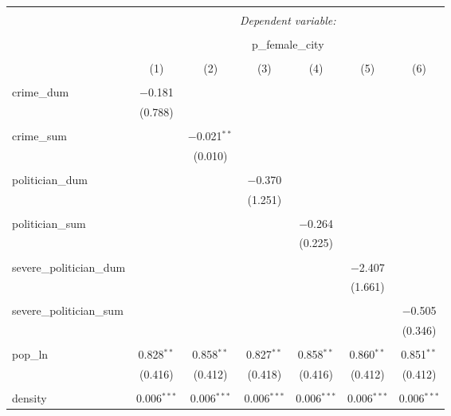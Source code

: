 
\begin{table}[!htbp] \centering 
  \caption{} 
  \label{} 
\begin{tabular}{@{\extracolsep{5pt}}lcccccc} 
\\[-1.8ex]\hline 
\hline \\[-1.8ex] 
 & \multicolumn{6}{c}{\textit{Dependent variable:}} \\ 
\cline{2-7} 
\\[-1.8ex] & \multicolumn{6}{c}{p\_female\_city} \\ 
\\[-1.8ex] & (1) & (2) & (3) & (4) & (5) & (6)\\ 
\hline \\[-1.8ex] 
 crime\_dum & $-$0.181 &  &  &  &  &  \\ 
  & (0.788) &  &  &  &  &  \\ 
  & & & & & & \\ 
 crime\_sum &  & $-$0.021$^{**}$ &  &  &  &  \\ 
  &  & (0.010) &  &  &  &  \\ 
  & & & & & & \\ 
 politician\_dum &  &  & $-$0.370 &  &  &  \\ 
  &  &  & (1.251) &  &  &  \\ 
  & & & & & & \\ 
 politician\_sum &  &  &  & $-$0.264 &  &  \\ 
  &  &  &  & (0.225) &  &  \\ 
  & & & & & & \\ 
 severe\_politician\_dum &  &  &  &  & $-$2.407 &  \\ 
  &  &  &  &  & (1.661) &  \\ 
  & & & & & & \\ 
 severe\_politician\_sum &  &  &  &  &  & $-$0.505 \\ 
  &  &  &  &  &  & (0.346) \\ 
  & & & & & & \\ 
 pop\_ln & 0.828$^{**}$ & 0.858$^{**}$ & 0.827$^{**}$ & 0.858$^{**}$ & 0.860$^{**}$ & 0.851$^{**}$ \\ 
  & (0.416) & (0.412) & (0.418) & (0.416) & (0.412) & (0.412) \\ 
  & & & & & & \\ 
 density & 0.006$^{***}$ & 0.006$^{***}$ & 0.006$^{***}$ & 0.006$^{***}$ & 0.006$^{***}$ & 0.006$^{***}$ \\ 

\end{tabular}
\end{table}
